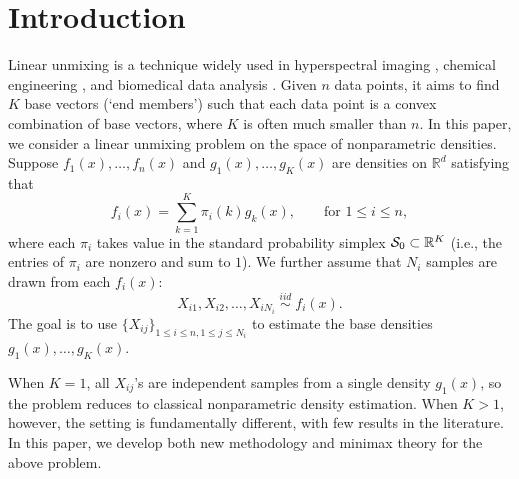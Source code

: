 \documentclass[preprint,11pt]{article}
\def\r#1{\textcolor{red}{\bf #1}}
\numberwithin{equation}{section}
\newcommand{\beq}{\begin{equation}}
\newcommand{\eeq}{\end{equation}}
\begin{document}
\tableofcontents

\section{Introduction} \label{sec:Intro}
Linear unmixing is a technique widely used in hyperspectral imaging \citep{bioucas2012hyperspectral}, chemical engineering \citep{kwan2006novel,ayhan2015use}, and biomedical data analysis \citep{dey2017visualizing, wang2022non}. Given $n$ data points, it aims to find $K$ base vectors (`end members') such that each data point is a convex combination of base vectors, where $K$ is often much smaller than $n$. In this paper, we consider a linear unmixing problem on the space of nonparametric densities. Suppose $f_1(x), \ldots, f_n(x)$ and $g_1(x),\ldots,g_K(x)$ are densities on $\mathbb{R}^d$ satisfying that
\beq \label{model-1}
f_i(x) = \sum_{k=1}^K \pi_i(k)g_k(x), \qquad\mbox{for $1\leq i\leq n$}, 
\eeq
where each $\pi_i$ takes value in the standard probability simplex ${\cal S}_0\subset\mathbb{R}^K$ (i.e., the entries of $\pi_i$ are nonzero and sum to $1$). 
We further assume that $N_i$ samples are drawn from each $f_i(x)$:
\beq \label{model-2}
X_{i1}, X_{i2}, \ldots, X_{iN_i}\; \overset{iid}{\sim}\; f_i(x). 
\eeq
The goal is to use $\{X_{ij}\}_{1\leq i\leq n,1\leq j\leq N_i}$ to estimate the base densities $g_1(x), \ldots,g_K(x)$.  %


When $K=1$, all $X_{ij}$'s are independent samples from a single density $g_1(x)$, so the problem reduces to classical nonparametric density estimation. When $K>1$, however, the setting is fundamentally different, with few results in the literature. In this paper, we develop both new methodology and minimax theory for the above problem. 
\end{document}
